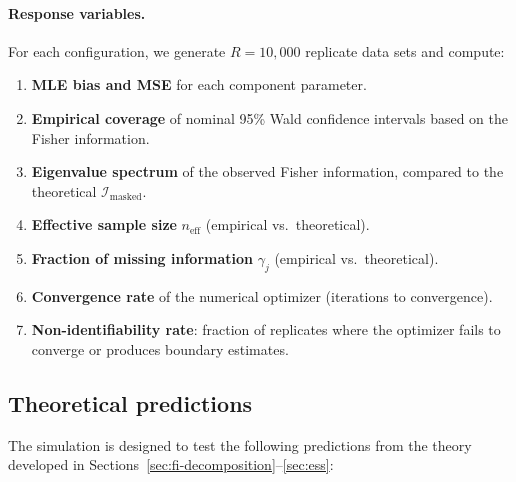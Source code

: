 \documentclass[11pt]{article}
\theoremstyle{definition}
\theoremstyle{plain}
\newcommand{\FI}{\mathcal{I}}       %
\begin{document}
\paragraph{Response variables.}
For each configuration, we generate $R = 10{,}000$ replicate data
sets and compute:
\begin{enumerate}[nosep]
    \item \textbf{MLE bias and MSE} for each component parameter.
    \item \textbf{Empirical coverage} of nominal 95\% Wald confidence
    intervals based on the Fisher information.
    \item \textbf{Eigenvalue spectrum} of the observed Fisher
    information, compared to the theoretical $\FI_{\mathrm{masked}}$.
    \item \textbf{Effective sample size} $n_{\mathrm{eff}}$ (empirical
    vs.\ theoretical).
    \item \textbf{Fraction of missing information} $\gamma_j$
    (empirical vs.\ theoretical).
    \item \textbf{Convergence rate} of the numerical optimizer
    (iterations to convergence).
    \item \textbf{Non-identifiability rate}: fraction of replicates
    where the optimizer fails to converge or produces boundary estimates.
\end{enumerate}

\subsection{Theoretical predictions}

The simulation is designed to test the following predictions from the
theory developed in Sections~\ref{sec:fi-decomposition}--\ref{sec:ess}:
\end{document}
